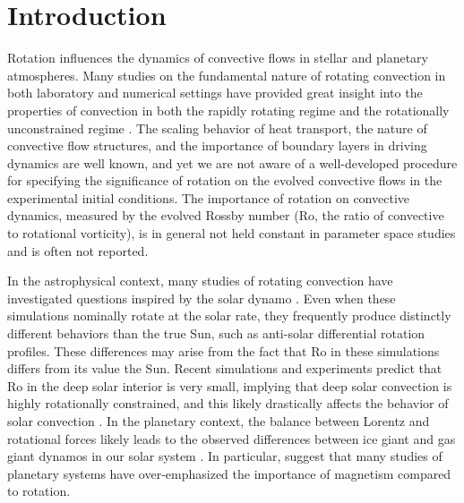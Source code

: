\documentclass[twocolumn, amsmath, amsfonts, amssymb]{aastex62}
\begin{document}
\section{Introduction}
\label{sec:intro}
Rotation influences the dynamics of convective flows in
stellar and planetary atmospheres.
Many studies on the fundamental nature of
rotating convection in both laboratory and numerical settings
have provided great insight into the properties of convection 
in both the rapidly rotating regime 
\citep{julien&all2012, stellmach&all2014, gastine&all2016}
and the rotationally unconstrained regime \citep{king&all2009, zhong&all2009, 
cheng&all2015}. The scaling behavior of heat transport, the nature of convective flow
structures, and the importance of boundary layers in driving dynamics are well known,
and yet we are not aware of a well-developed
procedure for specifying the significance of rotation on the evolved
convective flows in the experimental initial conditions.
The importance of rotation on convective dynamics,
measured by the evolved Rossby number
(Ro, the ratio of convective to rotational vorticity),
is in general not held constant in parameter space studies and is often not
reported.

In the astrophysical context,
many studies of rotating convection have investigated questions inspired by the solar dynamo
\citep{glatzmaier&gilman1982, busse2002, brown&all2008,
brown&all2010, brown&all2011, augustson&all2012, guerrero&all2013, kapyla&all2014}.
Even when these simulations nominally rotate at the solar rate,
they frequently produce distinctly different behaviors than the true Sun,
such as anti-solar differential rotation profiles.
These differences
may arise from the fact that Ro in these simulations differs from
its value the Sun. Recent simulations and experiments predict
that Ro in the deep solar interior is very small, implying that deep solar convection
is highly rotationally constrained, and this likely drastically
affects the behavior of solar convection
\citep{featherstone&hindman2016, greer&all2016}.
In the planetary context, the balance between Lorentz
and rotational forces likely leads to the observed differences between ice
giant and gas giant dynamos in our solar system \citep{soderlund&all2015}.
In particular, \cite{aurnou&king2017} suggest that many studies of planetary systems
have over-emphasized the importance of magnetism compared to rotation.
\end{document}
